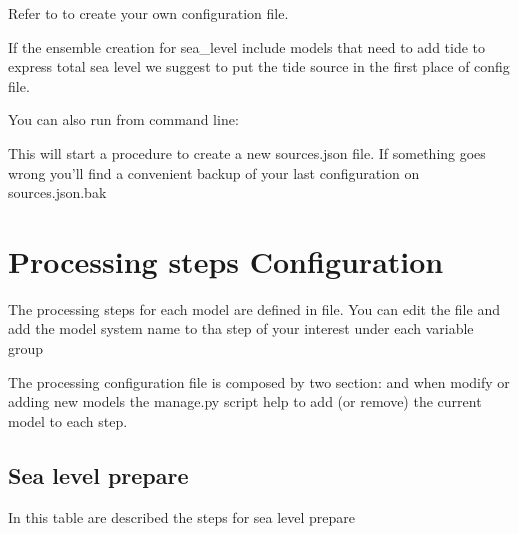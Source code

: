 \documentclass[letterpaper,10pt,english]{sphinxmanual}
\begin{document}
Refer to  to create your own configuration file.

If the ensemble creation for sea\_level include models that need to add tide to express total sea level we suggest to put the tide source in the first place of config file.

You can also run from command line:
\begin{quote}

\end{quote}

This  will start a  procedure to create a new sources.json file. If something goes wrong you’ll find a convenient backup of your last configuration on sources.json.bak


\section{Processing steps Configuration}
\label{\detokenize{configuration/index:processing-steps-configuration}}\label{\detokenize{configuration/index:proc-config}}
The processing steps for each model are defined in  file.
You can edit the file and add the model system name to tha step of your interest under each variable group

The processing configuration file is composed by two section:  and 
when modify or adding new models the manage.py script help to add (or remove) the current model to each step.


\subsection{Sea level prepare}
\label{\detokenize{configuration/index:sea-level-prepare}}
In this table are described the steps for sea level prepare
\end{document}
